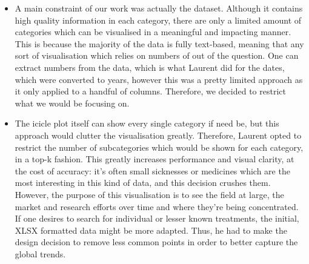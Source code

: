 \documentclass{article}
\begin{document}
\begin{itemize}
    \item A main constraint of our work was actually the dataset. Although it contains high quality information in each category, there are only a limited amount of categories which can be visualised in a meaningful and impacting manner. This is because the majority of the data is fully text-based, meaning that any sort of visualisation which relies on numbers of out of the question. One can extract numbers from the data, which is what Laurent did for the dates, which were converted to years, however this was a pretty limited approach as it only applied to a handful of columns. Therefore, we decided to restrict what we would be focusing on.

    \item The icicle plot itself can show every single category if need be, but this approach would clutter the visualisation greatly. Therefore, Laurent opted to restrict the number of subcategories which would be shown for each category, in a top-k fashion. This greatly increases performance and visual clarity, at the cost of accuracy: it's often small sicknesses or medicines which are the most interesting in this kind of data, and this decision crushes them. However, the purpose of this visualisation is to see the field at large, the market and research efforts over time and where they're being concentrated. If one desires to search for individual or lesser known treatments, the initial, XLSX formatted data might be more adapted. Thus, he had to make the design decision to remove less common points in order to better capture the global trends.


\end{itemize}
\end{document}
